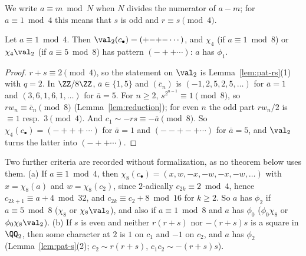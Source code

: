 We write $a \equiv m \bmod N$ when $N$ divides the numerator of $a - m$; for $a \equiv 1 \bmod 4$
this means that $s$ is odd and $r \equiv s \pmod 4$.

\begin{lemma}
  \label{lem:pat-dyadic}
  \leanok
  Let $a \equiv 1 \bmod 4$. Then $\val_2(c_\bullet) = ({+}{-}{+}{-}\cdots)$, and $\chi_4$ (if
  $a \equiv 1 \bmod 8$) or $\chi_4 \val_2$ (if $a \equiv 5 \bmod 8$) has pattern
  $({-}{+}{+}\cdots)$: $a$ has $\phi_1$.
\end{lemma}
\begin{proof}
  \leanok
  $r + s \equiv 2 \pmod 4$, so the statement on $\val_2$ is Lemma~\ref{lem:pat-rs}(1) with $q = 2$.
  In $\ZZ/8\ZZ$, $\bar a \in \{1, 5\}$ and $(\bar c_n)$ is $(-1, 2, 5, 2, 5, \dots)$ for
  $\bar a = 1$ and $(3, 6, 1, 6, 1, \dots)$ for $\bar a = 5$. For $n \ge 2$,
  $s^{2^{n-1}} \equiv 1 \pmod 8$, so $r w_n \equiv \bar c_n \pmod 8$ (Lemma~\ref{lem:reduction}); for
  even $n$ the odd part $r w_n / 2$ is $\equiv 1$ resp.\ $3 \pmod 4$. And
  $c_1 \sim -rs \equiv -\bar a \pmod 8$. So $\chi_4(c_\bullet) = ({-}{+}{+}{+}\cdots)$ for
  $\bar a = 1$ and $({-}{-}{+}{-}{+}\cdots)$ for $\bar a = 5$, and $\val_2$ turns the latter into
  $({-}{+}{+}\cdots)$.
\end{proof}

\begin{remark}
  \label{rem:phi2}
  Two further criteria are recorded without formalization, as no theorem below uses them.
  (a) If $a \equiv 1 \bmod 4$, then $\chi_8(c_\bullet) = (x, w, -x, -w, -x, -w, \dots)$ with
  $x = \chi_8(a)$ and $w = \chi_8(c_2)$, since $2$-adically $c_{2k} \equiv 2 \bmod 4$, hence
  $c_{2k+1} \equiv a + 4 \bmod 32$, and $c_{2k} \equiv c_2 + 8 \bmod 16$ for $k \ge 2$. So $a$ has
  $\phi_2$ if $a \equiv 5 \bmod 8$ ($\chi_8$ or $\chi_8 \val_2$), and also if $a \equiv 1 \bmod 8$
  and $a$ has $\phi_0$ ($\phi_0 \chi_8$ or $\phi_0 \chi_8 \val_2$).
  (b) If $s$ is even and neither $r(r + s)$ nor $-(r + s)s$ is a square in $\QQ_2$, then some
  character at $2$ is $1$ on $c_1$ and $-1$ on $c_2$, and $a$ has $\phi_2$
  (Lemma~\ref{lem:pat-s}(2); $c_2 \sim r(r+s)$, $c_1 c_2 \sim -(r+s)s$).
\end{remark}

